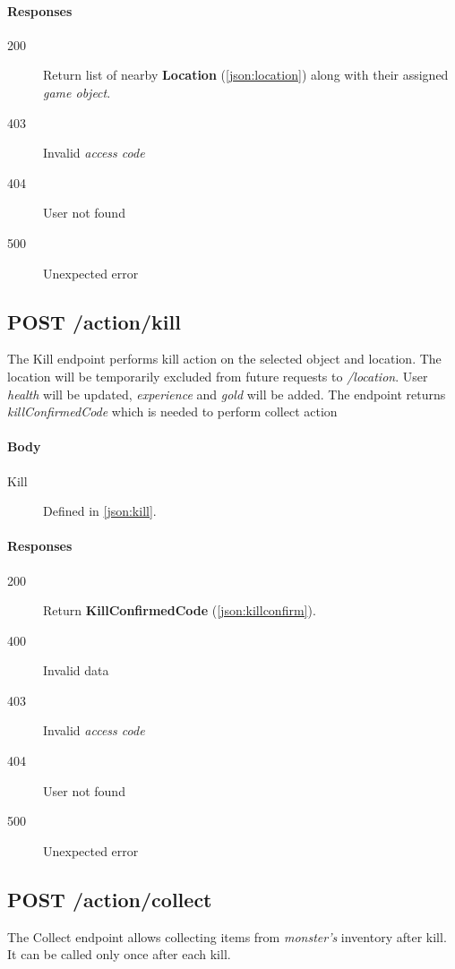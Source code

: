 		\paragraph*{Responses}
			\begin{description}
				\item[200] Return list of nearby \textbf{Location} (\ref{json:location}) along with their assigned \textit{game object}.
				\item[403] Invalid \textit{access code}
				\item[404] User not found
				\item[500] Unexpected error
			\end{description}
	
	\subsection{POST /action/kill}
	The Kill endpoint performs kill action on the selected object and location. The location will be temporarily excluded from future requests to \textit{/location}. User \textit{health} will be updated, \textit{experience} and \textit{gold} will be added. The endpoint returns \textit{killConfirmedCode} which is needed to perform collect action
		\paragraph*{Body}
			\begin{description}
				\item[Kill] Defined in \ref{json:kill}.
			\end{description}
		\paragraph*{Responses}
			\begin{description}
				\item[200] Return \textbf{KillConfirmedCode} (\ref{json:killconfirm}).
				\item[400] Invalid data
				\item[403] Invalid \textit{access code}
				\item[404] User not found
				\item[500] Unexpected error
			\end{description}
	
	\subsection{POST /action/collect}
	The Collect endpoint allows collecting items from \textit{monster's} inventory after kill. It can be called only once after each kill.
